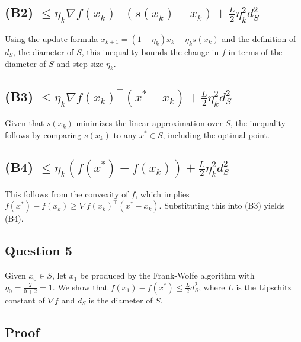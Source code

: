\documentclass[12p]{article}
\begin{document}
\subsection*{(B2) \( \leq \eta_k \nabla f(x_k)^\top (s(x_k) - x_k) + \frac{L}{2} \eta_k^2 d_S^2 \)}
Using the update formula \( x_{k+1} = (1 - \eta_k)x_k + \eta_k s(x_k) \) and the definition of \( d_S \), the diameter of \( S \), this inequality bounds the change in \( f \) in terms of the diameter of \( S \) and step size \( \eta_k \).

\subsection*{(B3) \( \leq \eta_k \nabla f(x_k)^\top (x^* - x_k) + \frac{L}{2} \eta_k^2 d_S^2 \)}
Given that \( s(x_k) \) minimizes the linear approximation over \( S \), the inequality follows by comparing \( s(x_k) \) to any \( x^* \in S \), including the optimal point.

\subsection*{(B4) \( \leq \eta_k (f(x^*) - f(x_k)) + \frac{L}{2} \eta_k^2 d_S^2 \)}
This follows from the convexity of \( f \), which implies \( f(x^*) - f(x_k) \geq \nabla f(x_k)^\top (x^* - x_k) \). Substituting this into (B3) yields (B4).


\subsection*{Question 5} 

Given \( x_0 \in S \), let \( x_1 \) be produced by the Frank-Wolfe algorithm with \( \eta_0 = \frac{2}{0+2} = 1 \). We show that \( f(x_1) - f(x^*) \leq \frac{L}{2} d_S^2 \), where \( L \) is the Lipschitz constant of \( \nabla f \) and \( d_S \) is the diameter of \( S \).

\subsection*{Proof}
\end{document}
